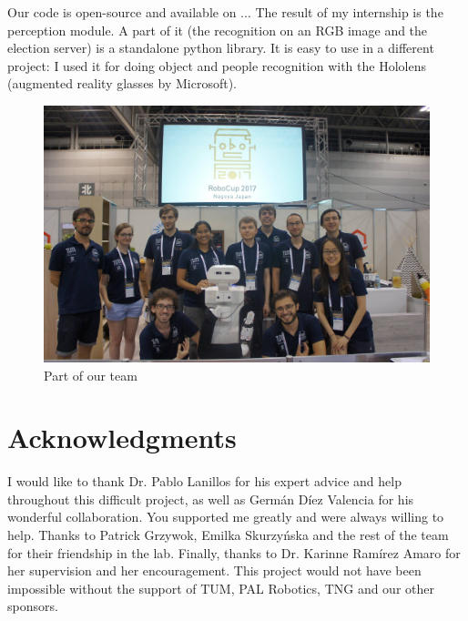 \documentclass[a4paper, twocolumn]{article}
\begin{document}
    Our code is open-source and available on ... The result of my internship is the perception module. A part of it (the recognition on an RGB image and the election server) is a standalone python library. It is easy to use in a different project: I used it for doing object and people recognition with the Hololens (augmented reality glasses by Microsoft).

    \begin{figure}[!t]
        \includegraphics[width=\columnwidth]{../img/team.jpg}
        \caption{Part of our team}
        \label{team}
    \end{figure}

    \section*{Acknowledgments}

    I would like to thank Dr. Pablo Lanillos for his expert advice and help throughout this difficult project, as well as Germ\'{a}n D\'{i}ez Valencia for his wonderful collaboration. You supported me greatly and were always willing to help. Thanks to Patrick Grzywok, Emilka Skurzy\'{n}ska and the rest of the team for their friendship in the lab. Finally, thanks to Dr. Karinne Ram\'{i}rez Amaro for her supervision and her encouragement. This project would not have been impossible without the support of TUM, PAL Robotics, TNG and our other sponsors.

    \vfill


	\pagebreak

	\twocolumn[{\begin{@twocolumnfalse}
		
		
	\end{@twocolumnfalse}}]
\end{document}
